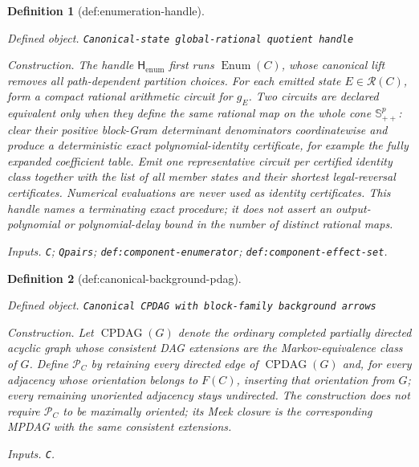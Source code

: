 \documentclass{article}
\newtheorem{definition}{Definition}
\begin{document}
\begin{definition}[def:enumeration-handle]\label{def:enumeration-handle}
\par\smallskip\noindent\emph{Defined object.} \texttt{Canonical-\allowbreak{}state global-\allowbreak{}rational quotient handle}
\par\smallskip\noindent\emph{Construction.} The handle \(\mathsf H_{\mathrm{enum}}\) first runs \(\operatorname{Enum}(C)\), whose canonical lift removes all path-dependent partition choices. For each emitted state \(E\in\mathcal R(C)\), form a compact rational arithmetic circuit for \(g_E\). Two circuits are declared equivalent only when they define the same rational map on the whole cone \(\mathbb S^p_{++}\): clear their positive block-Gram determinant denominators coordinatewise and produce a deterministic exact polynomial-identity certificate, for example the fully expanded coefficient table. Emit one representative circuit per certified identity class together with the list of all member states and their shortest legal-reversal certificates. Numerical evaluations are never used as identity certificates. This handle names a terminating exact procedure; it does not assert an output-polynomial or polynomial-delay bound in the number of distinct rational maps.
\par\smallskip\noindent\emph{Inputs.} \texttt{C}; \texttt{Qpairs}; \texttt{def:\allowbreak{}component-\allowbreak{}enumerator}; \texttt{def:\allowbreak{}component-\allowbreak{}effect-\allowbreak{}set}.
\end{definition}

\begin{definition}[def:canonical-background-pdag]\label{def:canonical-background-pdag}
\par\smallskip\noindent\emph{Defined object.} \texttt{Canonical CPDAG with block-\allowbreak{}family background arrows}
\par\smallskip\noindent\emph{Construction.} Let \(\operatorname{CPDAG}(G)\) denote the ordinary completed partially directed acyclic graph whose consistent DAG extensions are the Markov-equivalence class of \(G\). Define \(\mathcal P_C\) by retaining every directed edge of \(\operatorname{CPDAG}(G)\) and, for every adjacency whose orientation belongs to \(F(C)\), inserting that orientation from \(G\); every remaining unoriented adjacency stays undirected. The construction does not require \(\mathcal P_C\) to be maximally oriented; its Meek closure is the corresponding MPDAG with the same consistent extensions.
\par\smallskip\noindent\emph{Inputs.} \texttt{C}.
\end{definition}
\end{document}
